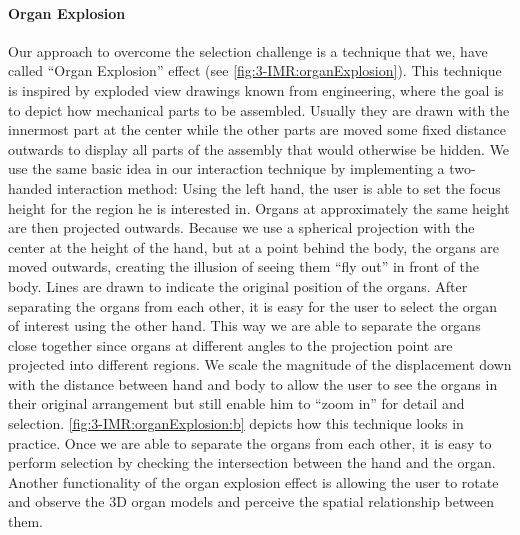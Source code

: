 \paragraph{Organ Explosion}
Our approach to overcome the selection challenge is a technique that we, have called ``Organ Explosion'' effect (see \figurename{\ref{fig:3-IMR:organExplosion}}).
This technique is inspired by exploded view drawings known from engineering, where the goal is to depict how mechanical parts to be assembled. Usually they are drawn with the innermost part at the center while the other parts are moved some fixed distance outwards to display all parts of the assembly that would otherwise be hidden.
We use the same basic idea in our interaction technique by implementing a two-handed interaction method: Using the left hand, the user is able to set the focus height for the region he is interested in. Organs at approximately the same height are then projected outwards. Because we use a spherical projection with the center at the height of the hand, but at a point behind the body, the organs are moved outwards, creating the illusion of seeing them ``fly out'' in front of the body. Lines are drawn to indicate the original position of the organs. After separating the organs from each other, it is easy for the user to select the organ of interest using the other hand.
This way we are able to separate the organs close together since organs at different angles to the projection point are projected into different regions. We scale the magnitude of the displacement down with the distance between hand and body to allow the user to see the organs in their original arrangement but still enable him to ``zoom in'' for detail and selection. \figurename{\ref{fig:3-IMR:organExplosion:b}} depicts how this technique looks in practice.
Once we are able to separate the organs from each other, it is easy to perform selection by checking the intersection between the hand and the organ. Another functionality of the organ explosion effect is allowing the user to rotate and observe the 3D organ models and perceive the spatial relationship between them.
